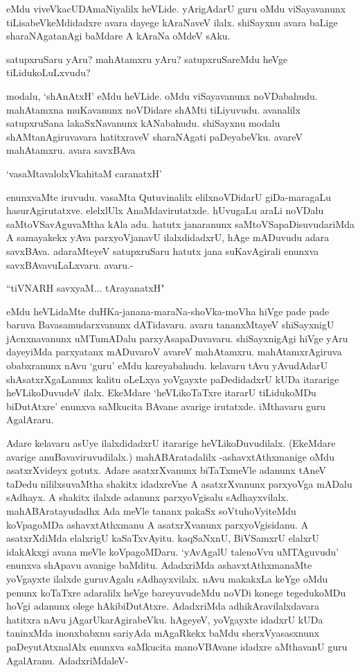 eMdu viveVkacUDAmaNiyalilx heVLide. yArigAdarU guru oMdu viSayavanunx tiLisabeVkeMdidadxre avara dayege kAraNaveV ilalx. shiSayxnu avara baLige sharaNAgatanAgi baMdare A kAraNa oMdeV sAku.

satupxruSaru yAru? mahAtamxru yAru? satupxruSareMdu heVge tiLidukoLuLxvudu?

modalu, `shAnAtxH' eMdu heVLide. oMdu viSayavanunx noVDabahudu. mahAtamxna muKavanunx noVDidare shAMti tiLiyuvudu. avanalilx satupxruSana lakaSxNavanunx kANabahudu. shiSayxnu modalu shAMtanAgiruvavara hatitxraveV sharaNAgati paDeyabeVku. avareV mahAtamxru. avara savxBAva

\begin{shloka}
`vasaMtavalolxVkahitaM caranatxH'
\end{shloka}

\noindent enunxvaMte iruvudu. vasaMta Qutuvinalilx elilxnoVDidarU giDa-maragaLu hasurAgirutatxve. elelxlUlx AnaMdavirutatxde. hUvugaLu araLi noVDalu saMtoVSavAguvaMtha kAla adu. hatutx janaranunx saMtoVSapaDisuvudariMda A samayakekx yAva parxyoVjanavU ilalxdidadxrU, hAge mADuvudu adara savxBAva. adaraMteyeV satupxruSaru hatutx jana suKavAgirali enunxva savxBAvavuLaLxvaru. avaru.-

\begin{shloka}
``tiVNARH savxyaM$\ldots$ tArayanatxH"
\end{shloka}

\noindent eMdu heVLidaMte duHKa-janana-maraNa-shoVka-moVha hiVge pade pade baruva Bavasamudarxvanunx dATidavaru. avaru tananxMtayeV shiSayxnigU jAcnxnavanunx uMTumADalu parxyAsapaDuvavaru. shiSayxnigAgi hiVge yAru dayeyiMda parxyatanx mADuvaroV avareV mahAtamxru. mahAtamxrAgiruva obabxranunx nAvu `guru' eMdu kareyabahudu. kelavaru tAvu yAvudAdarU shAsatxrXgaLanunx kalitu oLeLxya yoVgayxte paDedidadxrU kUDa itararige heVLikoDuvudeV ilalx. EkeMdare `heVLikoTaTxre itararU tiLidukoMDu biDutAtxre' enunxva saMkucita BAvane avarige irutatxde. iMthavaru guru AgalAraru.

Adare kelavaru asUye ilalxdidadxrU itararige heVLikoDuvudilalx. (EkeMdare avarige anuBavaviruvudilalx.) mahABAratadalilx -ashavxtAthxmanige oMdu asatxrXvideyx gotutx. Adare asatxrXvanunx biTaTxmeVle adanunx tAneV taDedu nililxsuvaMtha shakitx idadxreVne A asatxrXvanunx parxyoVga mADalu sAdhayx. A shakitx ilalxde adanunx parxyoVgisalu sAdhayxvilalx. mahABAratayudadhx Ada meVle tananx pakaSx soVtuhoVyiteMdu koVpagoMDa ashavxtAthxmanu A asatxrXvanunx parxyoVgisidanu. A asatxrXdiMda elalxrigU kaSaTxvAyitu. kaqSaNxnU, BiVSamxrU elalxrU idakAkxgi avana meVle koVpagoMDaru. `yAvAgalU talenoVvu uMTAguvudu' enunxva shApavu avanige baMditu. AdadxriMda ashavxtAthxmanaMte yoVgayxte ilalxde guruvAgalu sAdhayxvilalx. nAvu makakxLa keYge oMdu penunx koTaTxre adaralilx heVge bareyuvudeMdu noVDi konege tegedukoMDu hoVgi adanunx olege hAkibiDutAtxre. AdadxriMda adhikAravilalxdavara hatitxra nAvu jAgarUkarAgirabeVku. hAgeyeV, yoVgayxte idadxrU kUDa taninxMda inonxbabxnu sariyAda mAgaRkekx baMdu sherxVyasasxnunx paDeyutAtxnalAlx enunxva saMkucita manoVBAvane idadxre aMthavanU guru AgalAranu. AdadxriMdaleV-

